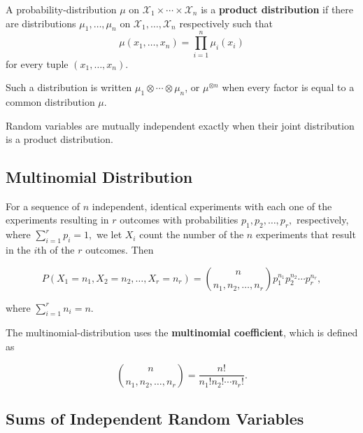 \documentclass{article}
\begin{document}
\begin{definition}
        A \@{probability-distribution} $\mu$ on $\mathcal{X}_1 \times \cdots \times \mathcal{X}_n$ is a \textbf{product distribution} if there are distributions $\mu_1, \dots, \mu_n$ on $\mathcal{X}_1, \dots, \mathcal{X}_n$ respectively such that
        \[ \mu(x_1, \dots, x_n) = \prod_{i=1}^{n} \mu_i(x_i) \]
        for every tuple $(x_1, \dots, x_n)$.

	Such a distribution is written $\mu_1 \otimes \cdots \otimes \mu_n$, or $\mu^{\otimes n}$ when every factor is equal to a common distribution $\mu$.
\end{definition}

\begin{theorem}
	\@{Random variables} are \@{mutually independent} exactly when their \@{joint distribution} is a \@{product distribution}.
\end{theorem}

\subsection{Multinomial Distribution}

\begin{definition}
For a \@{sequence} of $n$ \@{independent}, identical experiments with each one of the experiments resulting in $r$ outcomes with \@{probabilities} $p_1, p_2, \dots, p_r,$ respectively, where $\sum_{i=1}^r p_i = 1,$ we let $X_i$ count the number of the $n$ experiments that result in the $i$th of the $r$ outcomes. Then

\[ P(X_1 = n_1, X_2 = n_2, \dots, X_r = n_r) = \binom{n}{n_1, n_2, \dots, n_r}p_1^{n_1}p_2^{n_2}\cdots p_r^{n_r}, \]

where $\sum_{i=1}^r n_i = n.$
\end{definition}

\begin{definition}
The \@{multinomial-distribution} uses the \textbf{multinomial coefficient}, which is defined as

\[ \binom{n}{n_1,n_2,\dots,n_r} = \frac{n!}{n_1!n_2! \cdots n_r!}. \]
\end{definition}

\subsection{Sums of Independent Random Variables}
\end{document}
